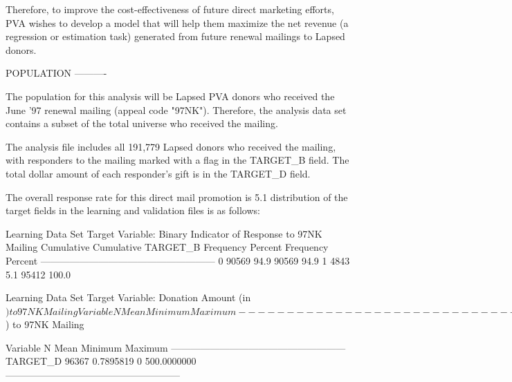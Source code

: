 \documentclass[
  11pt,
  a4paper,
  DIV=12,captions=tableheading,oneside,titlepage]{scrbook}
\let\oldverbatim\verbatim
\let\endoldverbatim\endverbatim
\renewenvironment{verbatim}{\footnotesize\oldverbatim}{\endoldverbatim}
\begin{document}
\begin{verbatim}
Therefore, to improve the cost-effectiveness of future direct
marketing efforts, PVA wishes to develop a model that will help them
maximize the net revenue (a regression or estimation task) generated
from future renewal mailings to Lapsed donors.

POPULATION
----------

The population for this analysis will be Lapsed PVA donors who
received the June '97 renewal mailing (appeal code "97NK").
Therefore, the analysis data set contains a subset of the total
universe who received the mailing.

The analysis file includes all 191,779 Lapsed donors who received the
mailing, with responders to the mailing marked with a flag in the
TARGET_B field.  The total dollar amount of each responder's gift is
in the TARGET_D field.

The overall response rate for this direct mail promotion is 5.1%.  The
distribution of the target fields in the learning and validation files
is as follows:


  Learning Data Set
  Target Variable: Binary Indicator of Response to 97NK 
  Mailing
                                Cumulative  Cumulative
  TARGET_B   Frequency   Percent   Frequency    Percent
  ------------------------------------------------------
         0      90569      94.9       90569       94.9
         1       4843       5.1       95412      100.0


  Learning Data Set
  Target Variable: Donation Amount (in $) to 97NK Mailing   

  Variable       N          Mean   Minimum       Maximum 
  ------------------------------------------------------ 
  TARGET_D   95412     0.7930732         0   200.0000000 
  ------------------------------------------------------ 



  Validation Data Set 
  Target Variable: Binary Indicator of Response to 97NK 
  Mailing
                                Cumulative  Cumulative
  TARGET_B   Frequency   Percent   Frequency    Percent
  ------------------------------------------------------
         0      91494      94.9       91494       94.9
         1       4873       5.1       96367      100.0

  Validation Data Set 
  Target Variable: Donation Amount (in $) to 97NK Mailing 

  Variable       N          Mean   Minimum       Maximum
  ------------------------------------------------------
  TARGET_D   96367     0.7895819         0   500.0000000
  ------------------------------------------------------



\end{verbatim}
\end{document}

